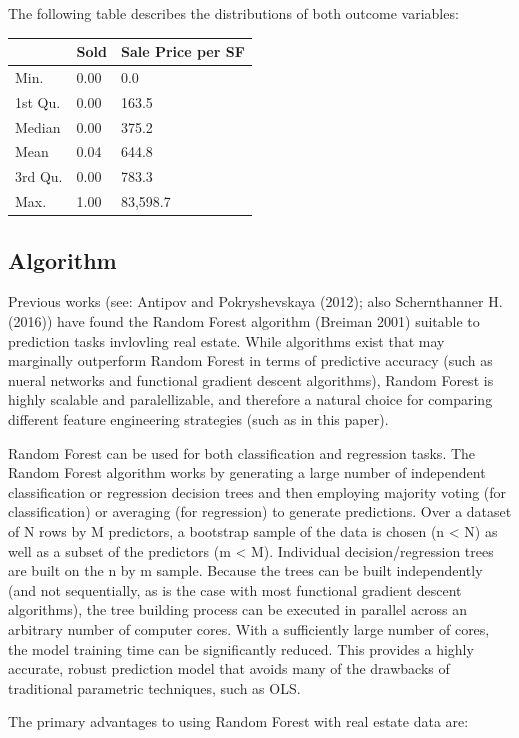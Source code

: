 \documentclass[]{article}
\begin{document}
The following table describes the distributions of both outcome
variables:

\begin{longtable}[]{@{}lll@{}}
\toprule
& Sold & Sale Price per SF\tabularnewline
\midrule
\endhead
Min. & 0.00 & 0.0\tabularnewline
1st Qu. & 0.00 & 163.5\tabularnewline
Median & 0.00 & 375.2\tabularnewline
Mean & 0.04 & 644.8\tabularnewline
3rd Qu. & 0.00 & 783.3\tabularnewline
Max. & 1.00 & 83,598.7\tabularnewline
\bottomrule
\end{longtable}

\subsection{Algorithm}\label{algorithm}

Previous works (see: Antipov and Pokryshevskaya (2012); also
Schernthanner H. (2016)) have found the Random Forest algorithm (Breiman
2001) suitable to prediction tasks invlovling real estate. While
algorithms exist that may marginally outperform Random Forest in terms
of predictive accuracy (such as nueral networks and functional gradient
descent algorithms), Random Forest is highly scalable and
paralellizable, and therefore a natural choice for comparing different
feature engineering strategies (such as in this paper).

Random Forest can be used for both classification and regression tasks.
The Random Forest algorithm works by generating a large number of
independent classification or regression decision trees and then
employing majority voting (for classification) or averaging (for
regression) to generate predictions. Over a dataset of N rows by M
predictors, a bootstrap sample of the data is chosen (n \textless{} N)
as well as a subset of the predictors (m \textless{} M). Individual
decision/regression trees are built on the n by m sample. Because the
trees can be built independently (and not sequentially, as is the case
with most functional gradient descent algorithms), the tree building
process can be executed in parallel across an arbitrary number of
computer cores. With a sufficiently large number of cores, the model
training time can be significantly reduced. This provides a highly
accurate, robust prediction model that avoids many of the drawbacks of
traditional parametric techniques, such as OLS.

The primary advantages to using Random Forest with real estate data are:
\end{document}
